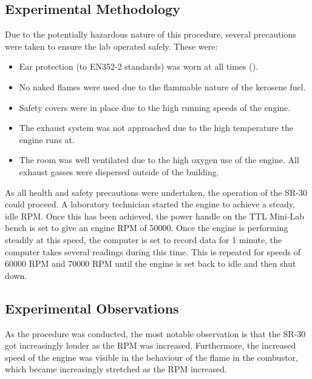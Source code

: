 \documentclass[stu, a4paper, 12pt, floatsintext]{apa7}
\numberwithin{figure}{section}
\numberwithin{table}{section}
\numberwithin{equation}{section}
\begin{document}
\subsection{Experimental Methodology}
Due to the potentially hazardous nature of this procedure, several precautions were taken to ensure the lab operated safely. These were:
\begin{itemize}
    \item Ear protection (to EN352-2 standards) was worn at all times (\cite{BSI_HearingProtectors}). 
    \item No naked flames were used due to the flammable nature of the kerosene fuel.
    \item Safety covers were in place due to the high running speeds of the engine.
    \item The exhaust system was not approached due to the high temperature the engine runs at.
    \item The room was well ventilated due to the high oxygen use of the engine. All exhaust gasses were dispersed outside of the building. 
\end{itemize}
As all health and safety precautions were undertaken, the operation of the SR-30 could proceed. A laboratory technician started the engine to achieve a steady, idle RPM. Once this has been achieved, the power handle on the TTL Mini-Lab bench is set to give an engine RPM of 50000. Once the engine is performing steadily at this speed, the computer is set to record data for 1 minute, the computer takes several readings during this time. This is repeated for speeds of 60000 RPM and 70000 RPM until the engine is set back to idle and then shut down.
\subsection{Experimental Observations}
As the procedure was conducted, the most notable observation is that the SR-30 got increasingly louder as the RPM was increased. Furthermore, the increased speed of the engine was visible in the behaviour of the flame in the combustor, which became increasingly stretched as the RPM increased.
\end{document}
